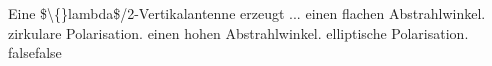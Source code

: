     {Eine \$\textbackslash\{\}lambda\$/2-Vertikalantenne erzeugt ...}
    {einen flachen Abstrahlwinkel.}
    {zirkulare Polarisation.}
    {einen hohen Abstrahlwinkel.}
    {elliptische Polarisation.}
    {false}{false}